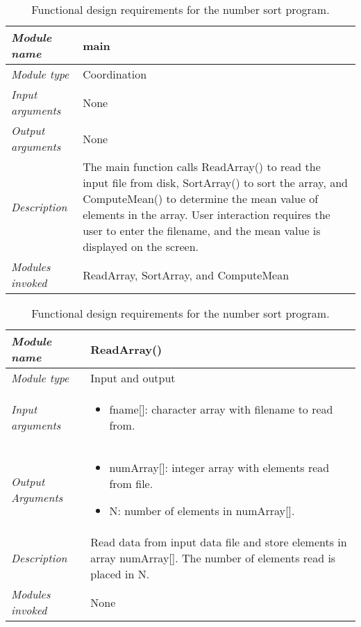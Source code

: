 \begin{table}[h]
\small
\caption{Functional design requirements for the number  sort  program.}
\label{table:functionalSort}

\begin{tabular}{|l|m{10cm}|}
\hline
\emph{Module name} & main\\ \hline
\emph{Module type} & Coordination \\ \hline
\emph{Input arguments} & None \\ \hline
\emph{Output arguments} & None \\ \hline
\emph{Description} & The main function calls ReadArray() to read the
input file from disk, SortArray() to sort the array, and ComputeMean()
to determine the mean value of elements in the array. User interaction
requires the user to enter the filename, and the mean value is displayed
on the screen. \\ \hline
\emph{Modules invoked} & ReadArray, SortArray, and ComputeMean \\ \hline
\end{tabular}
\vspace{0.2cm}

\begin{tabular}{|l|m{10cm}|}
\hline
\emph{Module name} & ReadArray() \\ \hline
\emph{Module type} & Input and output \\ \hline
\emph{Input arguments} & 
\begin{itemize}
\item fname{[}{]}: character array with filename to read from.
\end{itemize} \\ \hline
\emph{Output Arguments} & 
\begin{itemize}
\item numArray{[}{]}: integer array with elements read from file.
\item  N: number of elements in numArray{[}{]}.
\end{itemize}\\ \hline
\emph{Description} & Read data from input data file and store elements
in array numArray{[}{]}. The number of elements read is placed in N. \\ \hline
\emph{Modules invoked} & None \\ \hline
\end{tabular}
\vspace{0.2cm}


\end{table}
